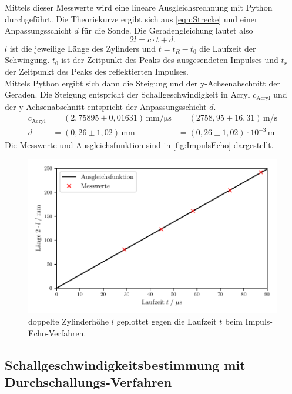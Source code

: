 Mittels dieser Messwerte wird eine lineare Ausgleichsrechnung mit Python durchgeführt. Die Theoriekurve ergibt sich aus
\autoref{eqn:Strecke} und einer Anpassungsschicht $d$ für die Sonde. Die Geradengleichung lautet also
\begin{equation}
  2l = c \cdot t + d.
\end{equation}
$l$ ist die jeweilige Länge des Zylinders und $t = t_R - t_0$ die Laufzeit der Schwingung. $t_0$ ist der Zeitpunkt
des Peaks des ausgesendeten Impulses und $t_r$ der Zeitpunkt des Peaks des reflektierten Impulses.\\
Mittels Python ergibt sich dann die Steigung und der y-Achsenabschnitt der Geraden. Die Steigung entspricht
der Schallgeschwindigkeit in Acryl $c_{\mathrm{Acryl}}$ und der y-Achsenabschnitt entspricht der Anpassungsschicht $d$.\\
\begin{align*}
  c_{\mathrm{Acryl}} &= (2,75895 \pm 0,01631) \, \si{\milli\meter\per\micro\second} &= (2758,95 \pm 16,31) \, \si{\meter\per\second} \\
  d &= (0,26 \pm 1,02) \, \si{\milli\meter} &= (0,26 \pm 1,02) \cdot 10^{-3} \, \si{\meter}
\end{align*}
Die Messwerte und Ausgleichsfunktion sind in \autoref{fig:ImpulsEcho} dargestellt.
\begin{figure}
  \centering
  \includegraphics[width=15cm]{messwerte/ImpulsEcho.pdf}
  \caption{doppelte Zylinderhöhe $l$ geplottet gegen die Laufzeit $t$ beim Impuls-Echo-Verfahren.}
  \label{fig:ImpulsEcho}
\end{figure}

\subsection{Schallgeschwindigkeitsbestimmung mit Durchschallungs-Verfahren}

